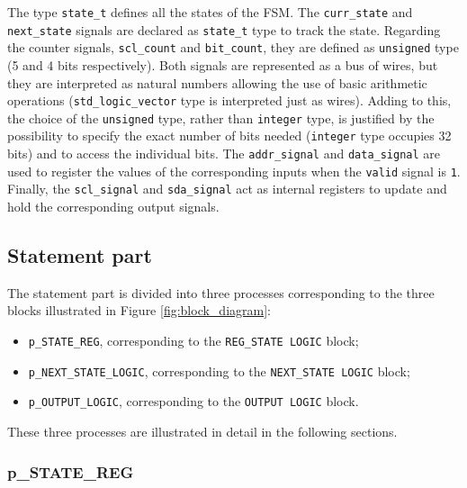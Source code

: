 

The type \texttt{state\_t} defines all the states of the FSM. The \texttt{curr\_state} and \texttt{next\_state} signals are declared as \texttt{state\_t} type to track the state. Regarding the counter signals, \texttt{scl\_count} and \texttt{bit\_count}, they are defined as \texttt{unsigned} type (5 and 4 bits respectively). Both signals are represented as a bus of wires, but they are interpreted as natural numbers allowing the use of basic arithmetic operations (\texttt{std\_logic\_vector} type is interpreted just as wires). Adding to this, the choice of the \texttt{unsigned} type, rather than \texttt{integer} type, is justified by the possibility to specify the exact number of bits needed (\texttt{integer} type occupies 32 bits) and to access the individual bits. The \texttt{addr\_signal} and \texttt{data\_signal} are used to register the values of the corresponding inputs when the \texttt{valid} signal is \texttt{1}. Finally, the \texttt{scl\_signal} and \texttt{sda\_signal} act as internal registers to update and hold the corresponding output signals.

\newpage

\subsection{Statement part}

The statement part is divided into three processes corresponding to the three blocks illustrated in Figure \ref{fig:block_diagram}:

\begin{itemize}
    \item \texttt{p\_STATE\_REG}, corresponding to the \texttt{REG\_STATE LOGIC} block;
    \item \texttt{p\_NEXT\_STATE\_LOGIC}, corresponding to the \texttt{NEXT\_STATE LOGIC} block;
    \item \texttt{p\_OUTPUT\_LOGIC}, corresponding to the \texttt{OUTPUT LOGIC} block.
\end{itemize}

These three processes are illustrated in detail in the following sections.


\subsubsection{p\_STATE\_REG}

